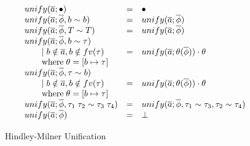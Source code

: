 \begin{figure}
\[
\begin{array}{l c l}
unify(\overline{a}; \bullet) &=& \bullet
\\
unify(\overline{a}; \overline{\phi}, b \sim b) &=& unify(\overline{a};
\overline{\phi})
\\
unify(\overline{a}; \overline{\phi}, T \sim T) &=& unify(\overline{a};
\overline{\phi})
\\
unify(\overline{a}; \overline{\phi}, b \sim \tau)
\\ \qquad \mid b \notin \overline{a}, b \notin fv(\tau) &=& unify(\overline{a};
\theta(\overline{\phi})) \cdot \theta
\\ \qquad \text{where} \; \theta = [b \mapsto \tau]
\\
unify(\overline{a}; \overline{\phi}, \tau \sim b)
\\ \qquad \mid b \notin \overline{a}, b \notin fv(\tau) &=& unify(\overline{a};
\theta(\overline{\phi})) \cdot \theta
\\ \qquad \text{where} \; \theta = [b \mapsto \tau]
\\
unify(\overline{a}; \overline{\phi}, \tau_1 \; \tau_2 \sim \tau_3 \; \tau_4) &=&
unify(\overline{a}; \overline{\phi}, \tau_1 \sim \tau_3, \tau_2 \sim \tau_4)
\\
unify(\overline{a}; \overline{\phi}) &=& \bot
\end{array}
\]
\caption{Hindley-Milner Unification}
\end{figure}
